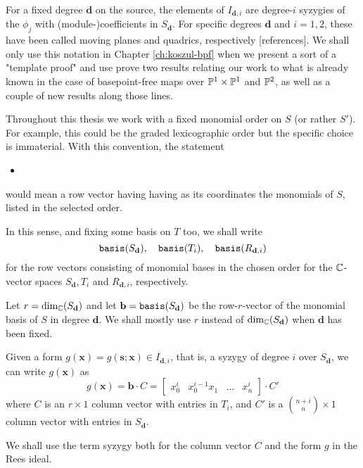 \documentclass[fleqn,reqno]{amsart}
\numberwithin{first}{chapter}
\begin{document}
\begin{paragraf}
\label{par:moving-planes-notation}
For a fixed degree $\mathbf d$ on the source,
the elements of $I_{\mathbf d,i}$ are degree-$i$ syzygies of the $\phi_j$ with (module-)coefficients
in $S_{\mathbf d}$.
For specific degrees $\mathbf d$ and $i=1,2$, these have been called moving planes and quadrics,
respectively [references].
We shall only use this notation in Chapter \ref{ch:koszul-bpf} when we present a sort of a "template proof"
and use prove two results relating our work to what is already known in the case of
basepoint-free maps over $\mathbb{P}^1\times\mathbb{P}^1$ and $\mathbb{P}^2$,
as well as a couple of new results along those lines.
\end{paragraf}

\begin{paragraf}
\label{par:basis}
Throughout this thesis we work with a fixed monomial order on $S$ (or rather $S'$).
For example, this could be the graded lexicographic order but the specific choice
is immaterial. With this convention, the statement
\begin{itemize}
\item[]
\end{itemize}
would mean a row vector having having as its coordinates the monomials of $S$,
listed in the selected order.

In this sense, and fixing some basis on $T$ too, we shall write
\[
\mathop{\tt basis}(S_{\mathbf d}),\quad\mathop{\tt basis}(T_i),\quad\mathop{\tt basis}(R_{\mathbf d,i})
\]
for the row vectors consisting of monomial bases in the chosen order for the $\mathbb{C}$-vector spaces
$S_{\mathbf d}, T_i$  and $R_{\mathbf d,i}$, respectively.
\end{paragraf}

\begin{paragraf}
\label{par:syzygies}
Let $r=\dim_{\mathbb{C}}(S_{\mathbf d})$ and
let $\mathbf b=\mathop{\tt basis}(S_{\mathbf d})$ be the row-$r$-vector of the monomial basis of $S$ in degree $\mathbf d$.
We shall mostly use $r$ instead of $\dim_{\mathbb{C}}(S_{\mathbf d})$ when $\mathbf d$ has been fixed.

Given a form $g(\mathbf x)=g(\mathbf s;\mathbf x)\in I_{\mathbf d,i}$,
that is, a syzygy of degree $i$ over $S_{\mathbf d}$,
we can write $g(\mathbf x)$ as
\[
g(\mathbf x)=\mathbf b\cdot C=
\begin{bmatrix}
	x_0^i& x_0^{i-1}x_1& \ldots& x_n^i
\end{bmatrix}\cdot C'
\]
where $C$ is an $r\times1$ column vector with entries in $T_i$,
and $C'$ is a $\binom{n+i}{n}\times1$ column vector with entries in $S_{\mathbf d}$.

We shall use the term syzygy both for the column vector $C$ and the form $g$ in the
Rees ideal.
\end{paragraf}
\end{document}
